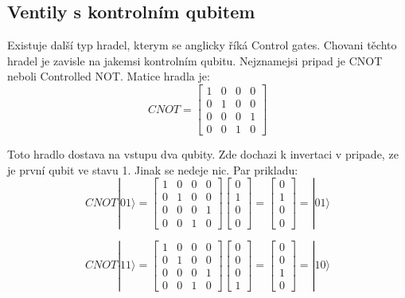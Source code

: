 \documentclass[12pt]{article}
\begin{document}
\subsection{Ventily s kontrolním qubitem}
Existuje další typ hradel, kterym se anglicky říká Control gates.
Chovani těchto hradel je zavisle na jakemsi kontrolním qubitu.
Nejznamejsi pripad je CNOT neboli Controlled NOT. Matice hradla je:
$$CNOT = \begin{bmatrix}
        1 & 0 & 0 & 0 \\
        0 & 1 & 0 & 0 \\
        0 & 0 & 0 & 1 \\
        0 & 0 & 1 & 0
    \end{bmatrix}$$
\par Toto hradlo dostava na vstupu dva qubity.
Zde dochazi k invertaci v pripade, ze je první qubit ve stavu 1.
Jinak se nedeje nic. Par prikladu:
$$CNOT|01\rangle = \begin{bmatrix}
        1 & 0 & 0 & 0 \\
        0 & 1 & 0 & 0 \\
        0 & 0 & 0 & 1 \\
        0 & 0 & 1 & 0
    \end{bmatrix}\begin{bmatrix}
        0 \\
        1 \\
        0 \\
        0
    \end{bmatrix} = \begin{bmatrix}
        0 \\
        1 \\
        0 \\
        0
    \end{bmatrix} = |01\rangle$$

$$CNOT|11\rangle = \begin{bmatrix}
        1 & 0 & 0 & 0 \\
        0 & 1 & 0 & 0 \\
        0 & 0 & 0 & 1 \\
        0 & 0 & 1 & 0
    \end{bmatrix}\begin{bmatrix}
        0 \\
        0 \\
        0 \\
        1
    \end{bmatrix} = \begin{bmatrix}
        0 \\
        0 \\
        1 \\
        0
    \end{bmatrix} = |10\rangle$$
\end{document}
